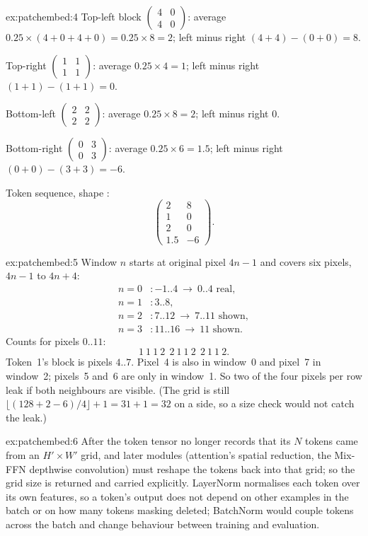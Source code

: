 \begin{solution}{ex:patchembed:4}
Top-left block $\begin{pmatrix}4&0\\4&0\end{pmatrix}$: average $0.25\times(4+0+4+0) = 0.25\times8 = 2$;
left minus right $(4+4) - (0+0) = 8$.

Top-right $\begin{pmatrix}1&1\\1&1\end{pmatrix}$: average $0.25\times4 = 1$; left minus right
$(1+1)-(1+1) = 0$.

Bottom-left $\begin{pmatrix}2&2\\2&2\end{pmatrix}$: average $0.25\times8 = 2$; left minus right $0$.

Bottom-right $\begin{pmatrix}0&3\\0&3\end{pmatrix}$: average $0.25\times6 = 1.5$; left minus right
$(0+0) - (3+3) = -6$.

Token sequence, shape :
\[
\begin{pmatrix}2 & 8\\ 1 & 0\\ 2 & 0\\ 1.5 & -6\end{pmatrix}.
\]
\end{solution}

\begin{solution}{ex:patchembed:5}
Window $n$ starts at original pixel $4n - 1$ and covers six pixels, $4n-1$ to $4n+4$:
\begin{align*}
n=0&: -1..4 \ \to\ 0..4 \text{ real},\\
n=1&: 3..8,\\
n=2&: 7..12 \ \to\ 7..11 \text{ shown},\\
n=3&: 11..16 \ \to\ 11 \text{ shown}.
\end{align*}
Counts for pixels $0..11$:
\[
1\ 1\ 1\ 2\ \ 2\ 1\ 1\ 2\ \ 2\ 1\ 1\ 2 .
\]
Token~1's block is pixels $4..7$. Pixel~4 is also in window~0 and pixel~7 in window~2; pixels~5 and~6
are only in window~1. So two of the four pixels per row leak if both neighbours are visible. (The grid is
still $\lfloor(128 + 2 - 6)/4\rfloor + 1 = 31 + 1 = 32$ on a side, so a size check would not catch the
leak.)
\end{solution}

\begin{solution}{ex:patchembed:6}
After  the token tensor no longer records that its $N$ tokens came from an
$H'\times W'$ grid, and later modules (attention's spatial reduction, the Mix-FFN depthwise
convolution) must reshape the tokens back into that grid; so the grid size is returned and carried
explicitly. LayerNorm normalises each token over its own features, so a token's output does not depend
on other examples in the batch or on how many tokens masking deleted; BatchNorm would couple tokens
across the batch and change behaviour between training and evaluation.
\end{solution}
